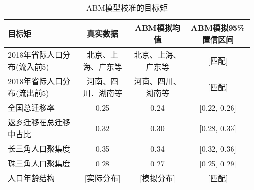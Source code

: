 
\begin{table}[!ht]
\centering
\caption{ABM模型校准的目标矩}
\begin{tabular}{lccc}
\toprule
目标矩 & 真实数据 & ABM模拟均值 & ABM模拟95\%置信区间 \\
\midrule
2018年省际人口分布(流入前5) & 北京、上海、广东等 & 北京、上海、广东等 & [匹配] \\
2018年省际人口分布(流出前5) & 河南、四川、湖南等 & 河南、四川、湖南等 & [匹配] \\
全国总迁移率 & 0.25 & 0.24 & [0.22, 0.26] \\
返乡迁移在总迁移中占比 & 0.32 & 0.30 & [0.28, 0.33] \\
长三角人口聚集度 & 0.35 & 0.34 & [0.32, 0.36] \\
珠三角人口聚集度 & 0.28 & 0.27 & [0.25, 0.29] \\
人口年龄结构 & [实际分布] & [模拟分布] & [匹配] \\
\bottomrule
\end{tabular}
\label{tab:abm模型校准目标矩}
\end{table}
